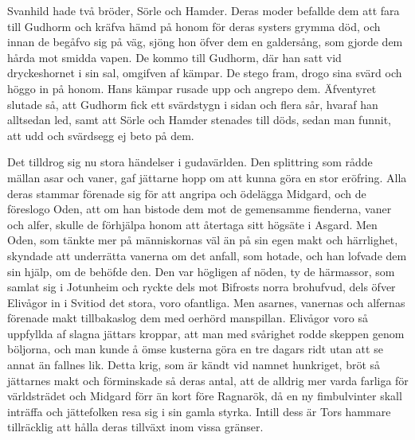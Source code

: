 Svanhild hade två bröder, Sörle och Hamder. Deras moder befallde dem att
fara till Gudhorm och kräfva hämd på honom för deras systers grymma död,
och innan de begåfvo sig på väg, sjöng hon öfver dem en galdersång, som
gjorde dem hårda mot smidda vapen. De kommo till Gudhorm, där han satt
vid dryckeshornet i sin sal, omgifven af kämpar. De stego fram, drogo
sina svärd och höggo in på honom. Hans kämpar rusade upp och angrepo
dem. Äfventyret slutade så, att Gudhorm fick ett svärdstygn i sidan och
flera sår, hvaraf han alltsedan led, samt att Sörle och Hamder stenades
till döds, sedan man funnit, att udd och svärdsegg ej beto på dem.

\sectionbreak

Det tilldrog sig nu stora händelser i gudavärlden. Den splittring som
rådde mällan asar och vaner, gaf jättarne hopp om att kunna göra en stor
eröfring. Alla deras stammar förenade sig för att angripa och ödelägga
Midgard, och de föreslogo Oden, att om han bistode dem mot de gemensamme
fienderna, vaner och alfer, skulle de förhjälpa honom att återtaga sitt
högsäte i Asgard. Men Oden, som tänkte mer på människornas väl än på sin
egen makt och härrlighet, skyndade att underrätta vanerna om det anfall,
som hotade, och
han lofvade dem sin hjälp, om de behöfde den. Den var högligen af nöden,
ty de härmassor, som samlat sig i Jotunheim och ryckte dels mot Bifrosts
norra brohufvud, dels öfver Elivågor in i Svitiod det stora, voro
ofantliga. Men asarnes, vanernas och alfernas förenade makt tillbakaslog
dem med oerhörd manspillan. Elivågor voro så uppfyllda af slagna jättars
kroppar, att man med svårighet rodde skeppen genom böljorna, och man
kunde å ömse kusterna göra en tre dagars ridt utan att se annat än
fallnes lik. Detta krig, som är kändt vid namnet hunkriget, bröt så
jättarnes makt och förminskade så deras antal, att de alldrig mer varda
farliga för världsträdet och Midgard förr än kort före Ragnarök, då en
ny fimbulvinter skall inträffa och jättefolken resa sig i sin gamla
styrka. Intill dess är Tors hammare tillräcklig att hålla deras tillväxt
inom vissa gränser.

